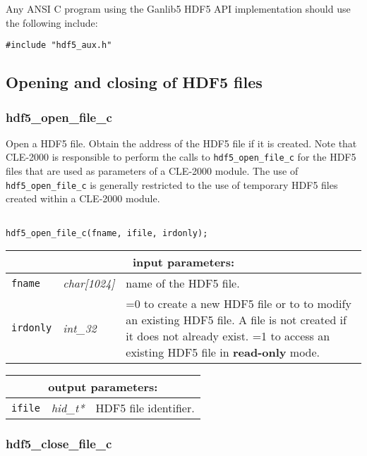Any ANSI C program using the Ganlib5 HDF5 API implementation should use the following include:
\begin{verbatim}
#include "hdf5_aux.h"
\end{verbatim}

\vskip 0.8cm

\subsection{Opening and closing of HDF5 files}

\subsubsection{hdf5\_open\_file\_c}

Open a HDF5 file. Obtain the address of the HDF5 file if it is created. Note that CLE-2000 is responsible to perform the calls to
{\tt hdf5\_open\_file\_c} for the HDF5 files that are used as parameters of a CLE-2000 module. The use
of {\tt hdf5\_open\_file\_c} is generally restricted to the use of temporary HDF5 files created within a CLE-2000 module.

\begin{verbatim}

hdf5_open_file_c(fname, ifile, irdonly);
\end{verbatim}

\noindent
\begin{tabular}{|p{1.5cm}|p{2cm}|p{11cm}|}
\hline
\multicolumn{3}{|c|}{\bf input parameters:} \\
\hline
{\tt fname} & {\it char[1024]} & name of the HDF5 file. \\
\hline
{\tt irdonly} & {\it int\_32} & =0 to create a new HDF5 file or to to modify an existing HDF5 file. A file is not created if it does not already exist. 
				=1 to access an existing HDF5 file in {\bf read-only} mode. \\
\hline
\end{tabular}

\vskip 0.8cm

\noindent
\begin{tabular}{|p{1.5cm}|p{2cm}|p{11cm}|}
\hline
\multicolumn{3}{|c|}{\bf output parameters:} \\
\hline
{\tt ifile} & {\it hid\_t*} & HDF5 file identifier. \\
\hline
\end{tabular}

\subsubsection{hdf5\_close\_file\_c}

